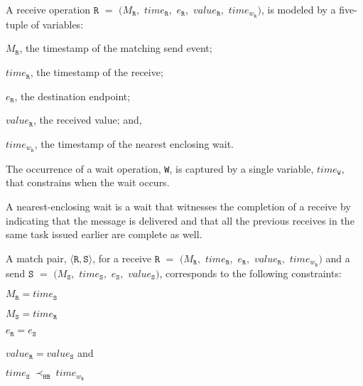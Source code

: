 \begin{definition}[Receive] \label{def:rcv}
A receive operation $\mathtt{R}$ $=$ $(M_\mathtt{R},$ $\mathit{time}_\mathtt{R},$ $e_\mathtt{R},$ $\mathit{value}_\mathtt{R},$ $\mathit{time}_{\mathit{w}_\mathtt{R}})$, is modeled by a five-tuple of variables:
\begin{compactenum}
\item $M_\mathtt{R}$, the timestamp of the matching send event;
\item $\mathit{time}_\mathtt{R}$, the timestamp of the receive;
\item $e_\mathtt{R}$, the destination endpoint;
\item $\mathit{value}_\mathtt{R}$, the received value; and,
\item $\mathit{time}_{\mathit{w}_\mathtt{R}}$, the timestamp of the nearest enclosing wait.
\end{compactenum}
\end{definition}

\begin{definition}[Wait] \label{def:wait}
The occurrence of a wait operation, \texttt{W}, is captured by a
single variable, $\mathit{time}_\mathtt{W}$, that constrains when
the wait occurs.
\end{definition}

\begin{definition} \label{def:nw}
A nearest-enclosing wait is a wait that witnesses the completion of a receive by indicating that
the message is delivered and that all the previous receives in the
same task issued earlier are complete as well.
\end{definition}

\begin{definition} \label{def:match}
A match pair, $\langle\mathtt{R}, \mathtt{S}\rangle$, for a receive 
$\mathtt{R}$ $=$ $(M_\mathtt{R},$ $\mathit{time}_\mathtt{R},$ $e_\mathtt{R},$ $\mathit{value}_\mathtt{R},$ $\mathit{time}_{\mathit{w}_\mathtt{R}})$ and a send $\mathtt{S}$ $=$ $(M_\mathtt{S},$ $\mathit{time}_\mathtt{S},$ $e_\mathtt{S},$ $\mathit{value}_\mathtt{S})$, corresponds to the following constraints:
\begin{compactenum}
\item $M_{\mathtt{R}} = \mathit{time}_{\mathtt{S}}$
\item $M_{\mathtt{S}} = \mathit{time}_{\mathtt{R}}$
\item $e_{\mathtt{R}} = e_{\mathtt{S}}$
\item $\mathit{value}_{\mathtt{R}} = \mathit{value}_{\mathtt{S}}$ and
\item $\mathit{time}_{\mathtt{S}}\ \mathrm{\prec_\mathtt{HB}}\ \mathit{time}_{\mathit{w}_\mathtt{R}}$
\end{compactenum}
\end{definition}

